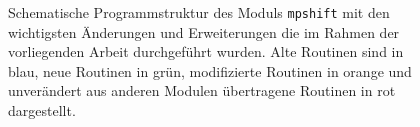 \begin{figure}[ht!]
	\centering
	\captionsetup{figurewithin = chapter}
	\captionsetup{font=small, labelfont=bf}\caption[Neue schematische Programmstruktur des Moduls \texttt{mpshift}]{Schematische Programmstruktur des Moduls \texttt{mpshift} mit den wichtigsten Änderungen und Erweiterungen die im Rahmen der vorliegenden Arbeit durchgeführt wurden. Alte Routinen sind in blau, neue Routinen in grün, modifizierte Routinen in orange und unverändert aus anderen Modulen übertragene Routinen in rot dargestellt.}
\label{abb:neue_programmstruktur}
\end{figure}
